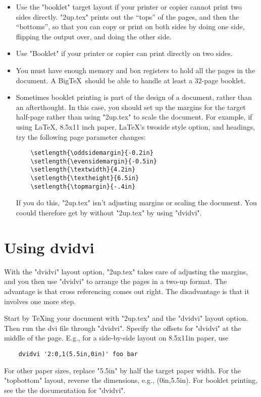 \documentclass[12pt]{article}
\begin{document}
\begin{itemize}

\item  Use the "booklet" target layout if your printer or copier cannot print
two
sides directly. "2up.tex" prints out the ``tops'' of the pages, and then the
``bottoms'', so that you can copy or print on both sides by doing one side,
flipping the output over, and doing the other side.

\item Use "Booklet" if your printer or copier can print directly on two sides.

\item You must have enough memory and box registers to hold all the pages in
the document. A Big\TeX\ should be able to handle at least a 32-page booklet.

\item Sometimes booklet printing is part of the design of a document, rather
than an afterthought. In this case, you should set up the margins for the
target half-page rather than using "2up.tex" to scale the document. For
example, if using \LaTeX, 8.5x11 inch paper, \LaTeX's twoside style option,
and headings, try the following page parameter changes:
\begin{verbatim}
    \setlength{\oddsidemargin}{-0.2in}
    \setlength{\evensidemargin}{-0.5in}
    \setlength{\textwidth}{4.2in}
    \setlength{\textheight}{6.5in}
    \setlength{\topmargin}{-.4in}
\end{verbatim}
If you do this, "2up.tex" isn't adjusting margins or scaling the
document. You coould therefore get by without "2up.tex" by using "dvidvi".
\end{itemize}

\section{Using dvidvi\label{dvidvi}}

  With the "dvidvi" layout option, "2up.tex" takes care of adjusting the
margins, and you then use "dvidvi" to arrange the pages in a two-up
format. The advantage is that cross referencing comes out right.
The disadvantage is that it involves one more step.

Start by \TeX ing your document with "2up.tex" and the "dvidvi" layout option.
Then run the dvi file through "dvidvi". Specify the offsets for "dvidvi" at
the middle of the page. E.g., for
a side-by-side layout on 8.5x11in paper, use
\begin{verbatim}
    dvidvi '2:0,1(5.5in,0in)' foo bar
\end{verbatim}
For other paper sizes, replace "5.5in" by half the target paper width. For the
"topbottom" layout, reverse the dimensions, e.g.,
(0in,5.5in). For booklet printing, see the
the documentation for "dvidvi".
\end{document}
